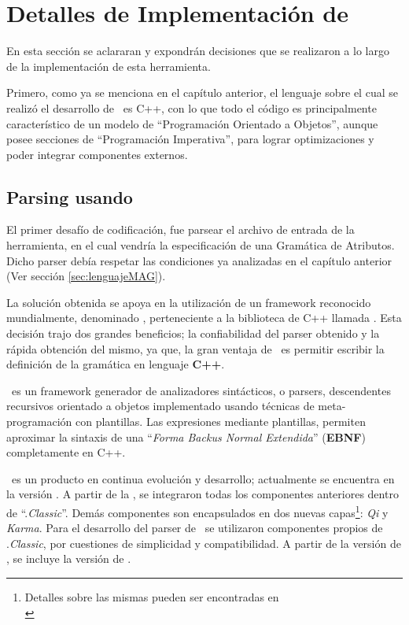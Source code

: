 \chapter{Detalles de Implementación de \maggen}
\label{chap:implem}
\minitoc

En esta sección se aclararan y expondrán decisiones que se realizaron a lo largo de la implementación de esta herramienta.

Primero, como ya se menciona en el capítulo anterior, el lenguaje sobre el cual se realizó el desarrollo de \maggen\ es C++, con lo que todo el código es principalmente característico de un modelo de ``Programación Orientado a Objetos'', aunque posee secciones de ``Programación Imperativa'', para lograr optimizaciones y poder integrar componentes externos.

\section{Parsing usando \boost\ \spirit}
\label{sec:par-spirit}
El primer desafío de codificación, fue parsear el archivo de entrada de la herramienta, en el cual vendría la especificación de una Gramática de Atributos. Dicho parser debía respetar las condiciones ya analizadas en el capítulo anterior (Ver sección \ref{sec:lenguajeMAG}). 

La solución obtenida se apoya en la utilización de un framework reconocido mundialmente, denominado \spirit, perteneciente a la biblioteca de C++ llamada \boost. Esta decisión trajo dos grandes beneficios; la confiabilidad del parser obtenido y la rápida obtención del mismo, ya que, la gran ventaja de \spirit\ es permitir escribir la definición de la gramática en lenguaje \textbf{C++}.

\spirit\ es un framework generador de analizadores sintácticos, o parsers, descendentes recursivos orientado a objetos implementado usando técnicas de meta-programación con plantillas. Las expresiones mediante plantillas, permiten aproximar la sintaxis de una ``\textit{\textit{Forma Backus Normal Extendida}}'' (\textbf{EBNF}) completamente en C++.

\spirit\ es un producto en continua evolución y desarrollo; actualmente se encuentra en la versión . A partir de la , se integraron todas los componentes anteriores dentro de ``\spirit.\textit{Classic}''. Demás componentes son encapsulados en dos nuevas capas\footnote{Detalles sobre las mismas pueden ser encontradas en\\ }: \textit{Qi} y \textit{Karma}. Para el desarrollo del parser de \maggen\ se utilizaron componentes propios de \spirit.\textit{Classic}, por cuestiones de simplicidad y compatibilidad. A partir de la versión  de \boost, se incluye la versión  de \spirit.

